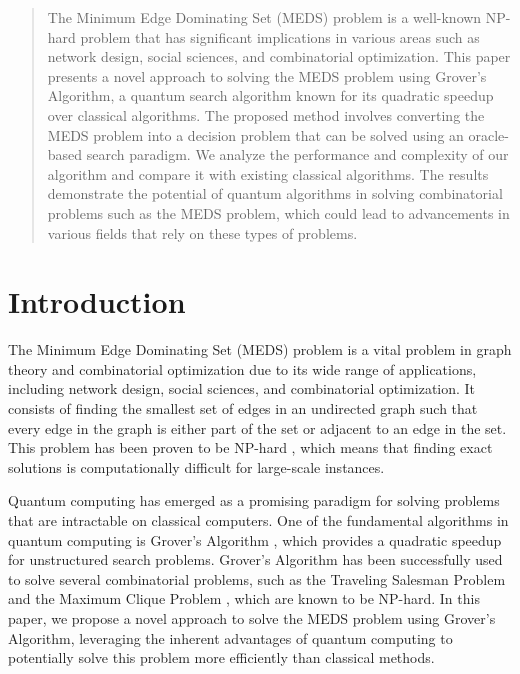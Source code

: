 \begin{abstract}
The Minimum Edge Dominating Set (MEDS) problem is a well-known NP-hard problem that has significant implications in various areas such as network design, social sciences, and combinatorial optimization. This paper presents a novel approach to solving the MEDS problem using Grover's Algorithm, a quantum search algorithm known for its quadratic speedup over classical algorithms. The proposed method involves converting the MEDS problem into a decision problem that can be solved using an oracle-based search paradigm. We analyze the performance and complexity of our algorithm and compare it with existing classical algorithms. The results demonstrate the potential of quantum algorithms in solving combinatorial problems such as the MEDS problem, which could lead to advancements in various fields that rely on these types of problems.

\end{abstract}

\section{Introduction}
The Minimum Edge Dominating Set (MEDS) problem is a vital problem in graph theory and combinatorial optimization due to its wide range of applications, including network design, social sciences, and combinatorial optimization. It consists of finding the smallest set of edges in an undirected graph such that every edge in the graph is either part of the set or adjacent to an edge in the set. This problem has been proven to be NP-hard \cite{garey1979computers}, which means that finding exact solutions is computationally difficult for large-scale instances.

Quantum computing has emerged as a promising paradigm for solving problems that are intractable on classical computers. One of the fundamental algorithms in quantum computing is Grover's Algorithm \cite{grover1996fast}, which provides a quadratic speedup for unstructured search problems. Grover's Algorithm has been successfully used to solve several combinatorial problems, such as the Traveling Salesman Problem \cite{durr1996quantum} and the Maximum Clique Problem \cite{childs2000quantum}, which are known to be NP-hard. In this paper, we propose a novel approach to solve the MEDS problem using Grover's Algorithm, leveraging the inherent advantages of quantum computing to potentially solve this problem more efficiently than classical methods.

